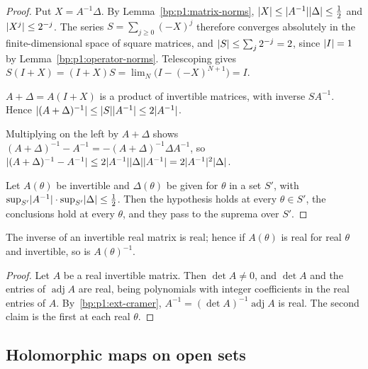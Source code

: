 \begin{proof}
\label{step:p1:neu-series}
Put $X=A^{-1}\Delta$. By Lemma~\ref{bp:p1:matrix-norms}, $\lvert X\rvert\le\lvert A^{-1}\rvert\lvert \Delta\rvert\le\frac12$ and
$\lvert X^j\rvert\le2^{-j}$. The series $S=\sum_{j\ge0}(-X)^j$ therefore converges absolutely in the
finite-dimensional space of square matrices, and $\lvert S\rvert\le\sum_j2^{-j}=2$, since $\lvert I\rvert=1$ by
Lemma~\ref{bp:p1:operator-norms}. Telescoping gives
$S(I+X)=(I+X)S=\lim_N\bigl(I-(-X)^{N+1}\bigr)=I$.

\label{step:p1:neu-inverse}
$A+\Delta=A(I+X)$ is a product of invertible matrices, with inverse $SA^{-1}$. Hence
$\lvert (A+\Delta)^{-1}\rvert\le\lvert S\rvert\lvert A^{-1}\rvert\le2\lvert A^{-1}\rvert$.

\label{step:p1:neu-difference}
Multiplying on the left by $A+\Delta$ shows $(A+\Delta)^{-1}-A^{-1}=-(A+\Delta)^{-1}\Delta A^{-1}$, so
$\lvert (A+\Delta)^{-1}-A^{-1}\rvert\le2\lvert A^{-1}\rvert\lvert \Delta\rvert\lvert A^{-1}\rvert=2\lvert A^{-1}\rvert^2\lvert \Delta\rvert$.

\label{step:p1:neu-pointwise}
Let $A(\theta)$ be invertible and $\Delta(\theta)$ be given for $\theta$ in a set $S'$, with
$\sup_{S'}\lvert A^{-1}\rvert\cdot\sup_{S'}\lvert \Delta\rvert\le\frac12$. Then the hypothesis holds at every
$\theta\in S'$, the conclusions hold at every $\theta$, and they pass to the suprema over $S'$.
\end{proof}

\begin{lemma}\label{bp:p1:real-inverse}
The inverse of an invertible real matrix is real; hence if $A(\theta)$ is real for real $\theta$ and invertible, so is
$A(\theta)^{-1}$.
\end{lemma}

\begin{proof}
\label{step:p1:ri-adjugate}
Let $A$ be a real invertible matrix. Then $\det A\ne0$, and $\det A$ and the entries of
$\operatorname{adj}A$ are real, being polynomials with integer coefficients in the real entries of $A$.
By~\ref{bp:p1:ext-cramer}, $A^{-1}=(\det A)^{-1}\operatorname{adj}A$ is real. The second claim is the
first at each real $\theta$.
\end{proof}

\subsection{Holomorphic maps on open sets}\label{bp:p1:sec-holomorphic}

